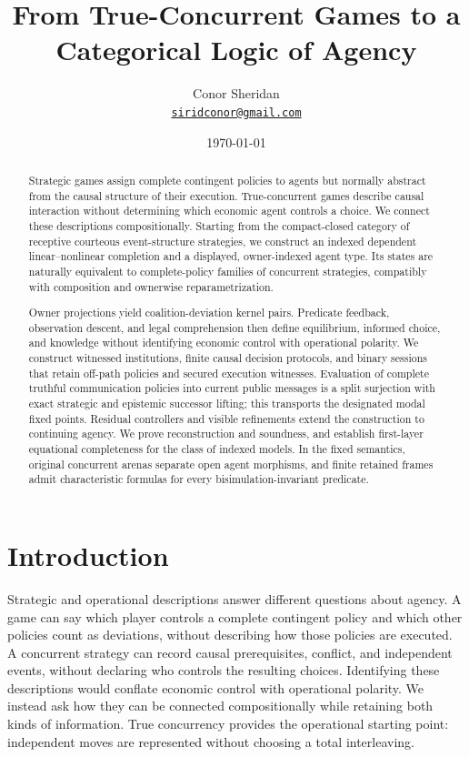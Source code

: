 \documentclass[11pt,a4paper]{article}
\title{From True-Concurrent Games to a Categorical Logic of Agency}
\author{
  Conor Sheridan\\[0.5ex]
  \href{mailto:siridconor@gmail.com}
       {\texttt{siridconor@gmail.com}}
}
\date{\today}
\numberwithin{equation}{section}
\theoremstyle{definition}
\theoremstyle{remark}
\theoremstyle{plain}
\begin{document}
\maketitle
\begin{abstract}
Strategic games assign complete contingent policies to agents but normally
abstract from the causal structure of their execution. True-concurrent games
describe causal interaction without determining which economic agent controls
a choice. We connect these descriptions compositionally. Starting from the
compact-closed category of receptive courteous event-structure strategies,
we construct an indexed dependent linear--nonlinear completion and a
displayed, owner-indexed agent type. Its states are naturally equivalent to
complete-policy families of concurrent strategies, compatibly with
composition and ownerwise reparametrization.

Owner projections yield coalition-deviation kernel pairs. Predicate feedback,
observation descent, and legal comprehension then define equilibrium,
informed choice, and knowledge without identifying economic control with
operational polarity. We construct witnessed institutions, finite causal
decision protocols, and binary sessions that retain off-path policies and
secured execution witnesses. Evaluation of complete truthful communication
policies into current public messages is a split surjection with exact
strategic and epistemic successor lifting; this transports the designated
modal fixed points. Residual controllers and visible refinements extend the
construction to continuing agency. We prove reconstruction and soundness,
and establish first-layer equational completeness for the class of indexed
models. In the fixed semantics, original concurrent arenas separate open
agent morphisms, and finite retained frames admit characteristic formulas
for every bisimulation-invariant predicate.
\end{abstract}
\tableofcontents
\clearpage

\section*{Introduction}\label{sec:paper-introduction}

Strategic and operational descriptions answer different questions about
agency. A game can say which player controls a complete contingent policy
and which other policies count as deviations, without describing how those
policies are executed. A concurrent strategy can record causal prerequisites,
conflict, and independent events, without declaring who controls the
resulting choices. Identifying these descriptions would conflate economic
control with operational polarity. We instead ask how they can be connected
compositionally while retaining both kinds of information. True concurrency
provides the operational starting point: independent moves are represented
without choosing a total interleaving.
\end{document}
